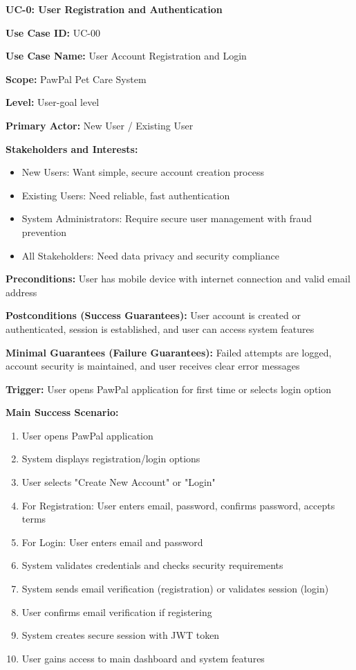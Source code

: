 \textbf{UC-0: User Registration and Authentication}

\textbf{Use Case ID:} UC-00

\textbf{Use Case Name:} User Account Registration and Login

\textbf{Scope:} PawPal Pet Care System

\textbf{Level:} User-goal level

\textbf{Primary Actor:} New User / Existing User

\textbf{Stakeholders and Interests:}
\begin{itemize}
    \item New Users: Want simple, secure account creation process
    \item Existing Users: Need reliable, fast authentication
    \item System Administrators: Require secure user management with fraud prevention
    \item All Stakeholders: Need data privacy and security compliance
\end{itemize}

\textbf{Preconditions:} User has mobile device with internet connection and valid email address

\textbf{Postconditions (Success Guarantees):} User account is created or authenticated, session is established, and user can access system features

\textbf{Minimal Guarantees (Failure Guarantees):} Failed attempts are logged, account security is maintained, and user receives clear error messages

\textbf{Trigger:} User opens PawPal application for first time or selects login option

\textbf{Main Success Scenario:}
\begin{enumerate}
    \item User opens PawPal application
    \item System displays registration/login options
    \item User selects "Create New Account" or "Login"
    \item For Registration: User enters email, password, confirms password, accepts terms
    \item For Login: User enters email and password
    \item System validates credentials and checks security requirements
    \item System sends email verification (registration) or validates session (login)
    \item User confirms email verification if registering
    \item System creates secure session with JWT token
    \item User gains access to main dashboard and system features
\end{enumerate}

